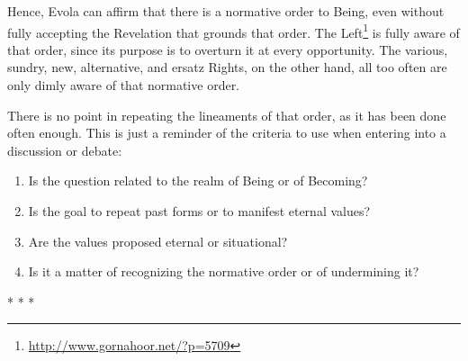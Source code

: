 Hence, Evola can affirm that there is a normative order to Being, even without fully accepting the Revelation that grounds that order. The Left\footnote{\url{http://www.gornahoor.net/?p=5709}} is fully aware of that order, since its purpose is to overturn it at every opportunity. The various, sundry, new, alternative, and ersatz Rights, on the other hand, all too often are only dimly aware of that normative order.

There is no point in repeating the lineaments of that order, as it has been done often enough. This is just a reminder of the criteria to use when entering into a discussion or debate:

\begin{enumerate}
\item Is the question related to the realm of Being or of Becoming? 
\item Is the goal to repeat past forms or to manifest eternal values? 
\item Are the values proposed eternal or situational? 
\item Is it a matter of recognizing the normative order or of undermining it? 
\end{enumerate}



\begin{center}* * *\end{center}

